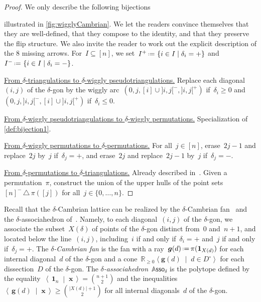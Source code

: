 \documentclass{amsart}
\theoremstyle{definition}
\newcommand{\R}{\mathbb{R}} %
\renewcommand{\b}[1]{{\boldsymbol{#1}}} %
\newcommand{\set}[2]{\left\{ #1 \;\middle|\; #2 \right\}} %
\newcommand{\setangle}[2]{\left\langle #1 \;\middle|\; #2 \right\rangle} %
\newcommand{\dotprod}[2]{\left\langle \, #1 \; \middle| \; #2 \, \right\rangle} %
\newcommand{\symdif}{\,\triangle\,} %
\newcommand{\one}{\b{1}} %
\newcommand{\eqdef}{\mbox{\,\raisebox{0.2ex}{\scriptsize\ensuremath{\mathrm:}}\ensuremath{=}\,}} %
\newcommand{\darkblue}{\color{darkblue}} %
\newcommand{\defn}[1]{\textsl{\darkblue #1}} %
\newcommand{\para}[1]{\smallskip\noindent\uline{#1.}} %
\newcommand{\polytope}[1]{\mathds{#1}} %
\newcommand{\Asso}{\polytope{A}\mathsf{sso}} %
\begin{document}
\begin{proof}
We only describe the following bijections
\begin{center}
\end{center}
illustrated in \cref{fig:wigglyCambrian}.
We let the readers convince themselves that they are well-defined, that they compose to the identity, and that they preserve the flip structure. We also invite the reader to work out the explicit description of the 8 missing arrows.
For~$I \subseteq [n]$, we set~$I^+ \eqdef \set{i \in I}{\delta_i = {+}}$ and~$I^- \eqdef \set{i \in I}{\delta_i = {-}}$.

\para{From $\delta$-triangulations to $\delta$-wiggly pseudotriangulations}
Replace each diagonal~$(i,j)$ of the $\delta$-gon by the wiggly arc~$(0, j, [i] \cup {]i,j[}^-, {]i,j[}^+)$ if~$\delta_i \ge 0$ and~$(0, j, {]i,j[}^-, [i] \cup {]i,j[}^+)$ if~$\delta_i \le 0$.

\para{From $\delta$-wiggly pseudotriangulations to $\delta$-wiggly permutations}
Specialization of \cref{def:bijection1}.

\para{From $\delta$-wiggly permutations to $\delta$-permutations}
For all~$j \in [n]$, erase~$2j-1$ and replace~$2j$ by~$j$ if~$\delta_j = {+}$, and erase~$2j$ and replace~$2j-1$ by~$j$ if~$\delta_j = {-}$.

\para{From $\delta$-permutations to $\delta$-triangulations}
Already described in~\cite{Reading-CambrianLattices}.
Given a permutation~$\pi$, construct the union of the upper hulls of the point sets~$[n]^- \symdif \pi([j])$ for all~$j \in \{0, \dots, n\}$.
\end{proof}

Recall that the $\delta$-Cambrian lattice can be realized by the $\delta$-Cambrian fan~\cite{ReadingSpeyer} and the $\delta$-associahedron of~\cite{HohlwegLange}.
Namely, to each diagonal~$(i,j)$ of the $\delta$-gon, we associate the subset~$X(\delta)$ of points of the $\delta$-gon distinct from~$0$ and~$n+1$, and located below the line~$(i,j)$, including~$i$ if and only if~$\delta_i = {+}$ and~$j$ if and only if~$\delta_j = {+}$.
The \defn{$\delta$-Cambrian fan} is the fan with a ray~$\b{g}(d) \eqdef \pi(\one_{X(d)})$ for each internal diagonal~$d$ of the $\delta$-gon and a cone~$\R_{\ge0} \setangle{\b{g}(d)}{d \in D^\circ}$ for each dissection~$D$ of the $\delta$-gon.
The \defn{$\delta$-associahedron}~$\Asso_\delta$ is the polytope defined by the equality~$\dotprod{\one_n}{\b{x}} = \binom{n+1}{2}$ and the inequalities~$\dotprod{\b{g}(d)}{\b{x}} \ge \binom{|X(d)|+1}{2}$ for all internal diagonals~$d$ of the $\delta$-gon.
\end{document}
